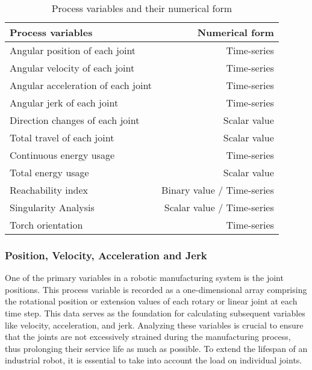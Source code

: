 \documentclass[conference]{IEEEtran}
\begin{document}
\begin{table}[H]
	\centering
	\caption{Process variables and their numerical form}
	\begin{tabular}{||l|r||}
		\hline
		Process variables & Numerical form\\
		\hline
		\hline
		\hline
		Angular position of each joint & Time-series\\
		Angular velocity of each joint & Time-series\\
		Angular acceleration of each joint& Time-series\\
		Angular jerk of each joint& Time-series\\
		\hline
		\hline
		Direction changes of each joint& Scalar value\\
		Total travel of each joint& Scalar value\\
		\hline
		\hline	
		
		
		
		Continuous energy usage & Time-series\\
		Total energy usage & Scalar value\\
		\hline
		\hline
		Reachability index & Binary value / Time-series\\
		Singularity Analysis & Scalar value / Time-series\\
		Torch orientation & Time-series\\
		
		
		\hline
		\hline
		
	\end{tabular}
	
	
	
	\label{procesparameters}
\end{table}

\subsubsection*{Position, Velocity, Acceleration and Jerk }
One of the primary variables in a robotic manufacturing system is the joint positions. This process variable is recorded as a one-dimensional array comprising the rotational position or extension values of each rotary or linear joint at each time step. This data serves as the foundation for calculating subsequent variables like velocity, acceleration, and jerk. Analyzing these variables is crucial to ensure that the joints are not excessively strained during the manufacturing process, thus prolonging their service life as much as possible. To extend the lifespan of an industrial robot, it is essential to take into account the load on individual joints.
\end{document}
